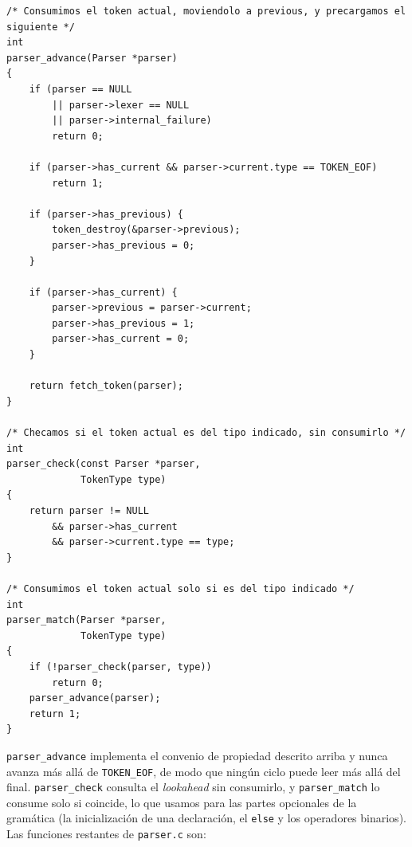 \documentclass[12pt,letterpaper]{article}
\begin{document}
\begin{lstlisting}[style=modernc, caption={Operaciones \texttt{parser\_advance}, \texttt{parser\_check} y \texttt{parser\_match}.}]
/* Consumimos el token actual, moviendolo a previous, y precargamos el siguiente */
int
parser_advance(Parser *parser)
{
    if (parser == NULL
        || parser->lexer == NULL
        || parser->internal_failure)
        return 0;

    if (parser->has_current && parser->current.type == TOKEN_EOF)
        return 1;

    if (parser->has_previous) {
        token_destroy(&parser->previous);
        parser->has_previous = 0;
    }

    if (parser->has_current) {
        parser->previous = parser->current;
        parser->has_previous = 1;
        parser->has_current = 0;
    }

    return fetch_token(parser);
}

/* Checamos si el token actual es del tipo indicado, sin consumirlo */
int
parser_check(const Parser *parser,
             TokenType type)
{
    return parser != NULL
        && parser->has_current
        && parser->current.type == type;
}

/* Consumimos el token actual solo si es del tipo indicado */
int
parser_match(Parser *parser,
             TokenType type)
{
    if (!parser_check(parser, type))
        return 0;
    parser_advance(parser);
    return 1;
}
\end{lstlisting}

\bigskip

\texttt{parser\_advance} implementa el convenio de propiedad descrito arriba y nunca avanza más allá de
\texttt{TOKEN\_EOF}, de modo que ningún ciclo puede leer más allá del final. \texttt{parser\_check} consulta el
\emph{lookahead} sin consumirlo, y \texttt{parser\_match} lo consume solo si coincide, lo que usamos para
las partes opcionales de la gramática (la inicialización de una declaración, el \texttt{else} y los operadores
binarios).\\

Las funciones restantes de \texttt{parser.c} son:
\end{document}
